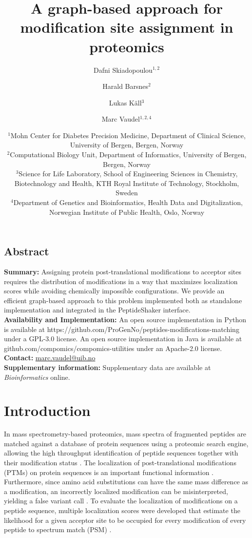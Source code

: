 \documentclass[]{article}
\title{A graph-based approach for modification site assignment in proteomics}
\author{Dafni Skiadopoulou$^{1,2}$ \and Harald Barsnes$^{2}$ \and Lukas Käll$^{3}$ \and Marc Vaudel$^{1,2,4}$}
\date{%
	$^1$Mohn Center for Diabetes Precision Medicine,
	Department of Clinical Science,
	University of Bergen, Bergen, Norway\\%
	$^2$Computational Biology Unit,
	Department of Informatics,
	University of Bergen, Bergen, Norway\\%
	$^3$Science for Life Laboratory,
	School of Engineering Sciences in Chemistry, Biotechnology and Health,
	KTH Royal Institute of Technology, Stockholm, Sweden\\
	$^4$Department of Genetics and Bioinformatics, Health Data and Digitalization,
	Norwegian Institute of Public Health, Oslo, Norway\\
}
\begin{document}
	
\maketitle

\subsection*{Abstract} 

\textbf{Summary:} 
	Assigning protein post-translational modifications to acceptor sites requires the distribution of modifications in a way that maximizes localization scores while avoiding chemically impossible configurations. We provide an efficient graph-based approach to this problem implemented both as standalone implementation and integrated in the PeptideShaker interface. \\
\textbf{Availability and Implementation:} 
	An open source implementation in Python is available at https://github.com/ProGenNo/peptides-modifications-matching under a GPL-3.0 license. An open source implementation in Java is available at github.com/compomics/compomics-utilities under an Apache-2.0 license. \\
\textbf{Contact:} \href{marc.vaudel@uib.no}{marc.vaudel@uib.no}\\
\textbf{Supplementary information:} Supplementary data are available at \textit{Bioinformatics}
online.

\maketitle

\section{Introduction}

In mass spectrometry-based proteomics, mass spectra of fragmented peptides are matched against a database of protein sequences using a proteomic search engine, allowing the high throughput identification of peptide sequences together with their modification status \cite{Mass_spec_proteomics}. The localization of post-translational modifications (PTMs) on protein sequences is an important functional information \cite{Phosphoproteomics}. Furthermore, since amino acid substitutions can have the same mass difference as a modification, an incorrectly localized modification can be misinterpreted, yielding a false variant call \cite{SNPs_PTMs_same_mass} . To evaluate the localization of modifications on a peptide sequence, multiple localization scores were developed that estimate the likelihood for a given acceptor site to be occupied for every modification of every peptide to spectrum match (PSM) \cite{Localization_scoring, computational_phosphoproteomics}.
\end{document}
